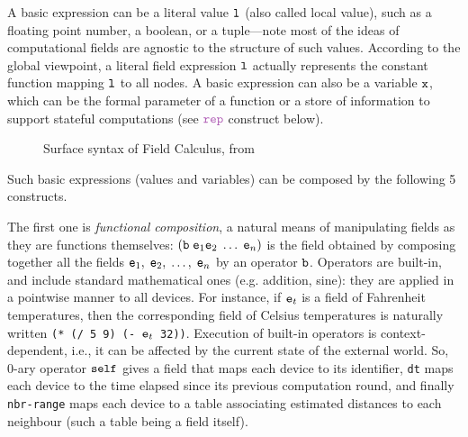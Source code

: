 \documentclass[12pt,a4paper,twoside,openright]{book}
\begin{document}
A basic expression can be a literal value $\texttt{l}$ (also called local value), such as a floating point number, a boolean, or a tuple---note most of the ideas of computational fields are agnostic to the
structure of such values.
%
According to the global viewpoint, a literal field expression $\texttt{l}$ actually represents the constant function mapping $\texttt{l}$ to all nodes.
%
A basic expression can also be a variable $\texttt{x}$, which can be the formal parameter of a function or a store of information to support stateful computations (see $\repN$ construct below).

\begin{figure}[!t]{
\centerline{}}
\caption{Surface syntax of Field Calculus, from \cite{VDB-FOCLASA-CIC2013}}
\label{fig:source:syntax}
\end{figure}

Such basic expressions (values and variables) can be composed by the following 5 constructs.

The first one is \emph{functional composition}, a natural means of manipulating fields as they are functions themselves: $(\texttt{b} \; \texttt{e}_1 \texttt{e}_2\;\ldots\;\texttt{e}_n)$ is the field obtained by composing together all the fields $\texttt{e}_1,\;\texttt{e}_2,\;\ldots,\;\texttt{e}_n$ by an operator $\texttt{b}$.
%
Operators are built-in, and include standard mathematical ones (e.g. addition, sine): they are applied in a pointwise manner to all devices.
%
For instance, if $\texttt{e}_t$ is a field of Fahrenheit temperatures, then the corresponding field of Celsius temperatures is naturally written \mbox{\texttt{(* (/ 5 9) (- $\texttt{e}_t$ 32))}}.
%
Execution of built-in operators is context-dependent, i.e., it can be affected by the current state of the external world.
%
So, 0-ary operator $\texttt{self}$ gives a field that maps each device to its identifier, \texttt{dt} maps each device to the time elapsed since its previous computation round, and finally \texttt{nbr-range} maps each device to a table associating estimated distances to each neighbour (such a table being a field itself).
\end{document}
